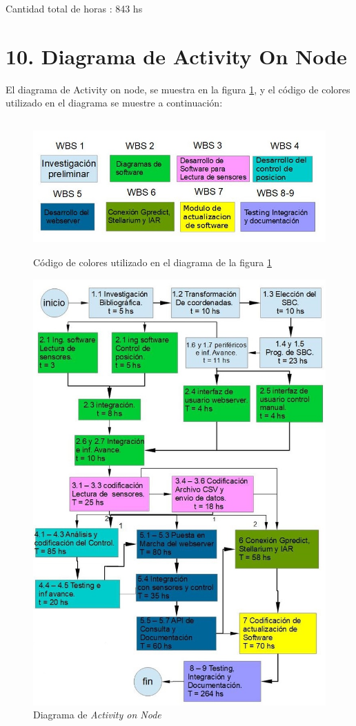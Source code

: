 \documentclass[11pt, %
codirector, %
]{charter}
\begin{document}
Cantidad total de horas :  843 hs  



\section{10. Diagrama de Activity On Node}
\label{sec:AoN}
El diagrama de Activity on node, se muestra en la figura \ref{fig:AoN}, y el código de colores utilizado en el diagrama se muestre a continuación: 
\begin{figure}[H]
	\includegraphics[width = \textwidth,height = 5.1cm]{./Figuras/AonGantt/cod_colores.jpg}
	\caption{Código de colores utilizado en el diagrama de la figura \ref{fig:AoN}}
\end{figure} 



\begin{figure}[p]
\centering
\includegraphics[width = \textwidth]{./Figuras/AonGantt/ActivityOnNode.jpg}
\caption{Diagrama de \textit{Activity on Node}}
\label{fig:AoN}
\end{figure}
\end{document}
